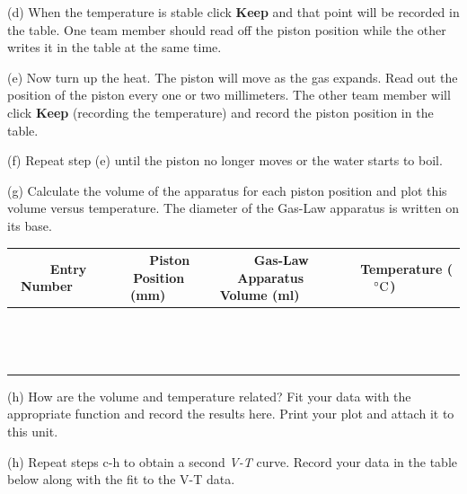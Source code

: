 (d) When the temperature is stable click {\bf Keep} and that point will be recorded in the
table. One team member should read off the piston position while the other 
writes it in the table at the same time.

(e) Now turn up the heat. The piston will move as the gas expands.
Read out the position of the piston every one or two millimeters. The other team member
will click {\bf Keep} (recording the temperature) and record the piston position
in the table.

(f) Repeat step (e) until the piston no longer moves or the water starts to boil.
 
(g) Calculate the volume of the apparatus for each piston position and plot
this volume versus temperature. The diameter of the Gas-Law apparatus is written on its
base.

\vspace{0.3cm}
{\centering \begin{tabular}{|c|c|c|c|}
\hline 
~~~Entry Number~~~&
~~~Piston Position (mm)~~~&
~~~Gas-Law Apparatus Volume (ml)~~~&
~~~Temperature ($^\circ  \rm C$)~~~\\
\hline
\hline 
&
&
&
\\
\hline 
&
&
&
\\
\hline 
&
&
&
\\
\hline 
&
&
&
\\
\hline 
&
&
&
\\
\hline 
&
&
&
\\
\hline 
&
&
&
\\
\hline 
&
&
&
\\
\hline 
&
&
&
\\
\hline
&
&
&
\\
\hline
&
&
&
\\
\hline
&
&
&
\\
\hline
&
&
&
\\
\hline
&
&
&
\\
\hline
\end{tabular}\par}
\vspace{0.3cm}

(h) How are the volume and temperature related?
Fit your data with the appropriate function and record the results here.
Print your plot and attach it to this unit.
\vspace{15mm}

(h) Repeat steps c-h to obtain a second {\it V-T} curve. Record your data in the table below
along with the fit to the V-T data.
\vspace{30mm}


